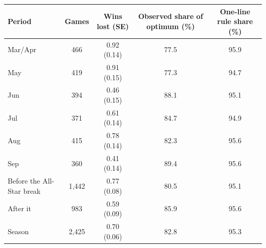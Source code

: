 \begin{tabular}{lcccc}
\toprule
Period & Games & Wins lost (SE) & Observed share of optimum (\%) & One-line rule share (\%) \\
\midrule
Mar/Apr & 466 & 0.92 (0.14) & 77.5 & 95.9 \\
May & 419 & 0.91 (0.15) & 77.3 & 94.7 \\
Jun & 394 & 0.46 (0.15) & 88.1 & 95.1 \\
Jul & 371 & 0.61 (0.14) & 84.7 & 94.9 \\
Aug & 415 & 0.78 (0.14) & 82.3 & 95.6 \\
Sep & 360 & 0.41 (0.14) & 89.4 & 95.6 \\
Before the All-Star break & 1{,}442 & 0.77 (0.08) & 80.5 & 95.1 \\
After it & 983 & 0.59 (0.09) & 85.9 & 95.6 \\
Season & 2{,}425 & 0.70 (0.06) & 82.8 & 95.3 \\
\bottomrule
\end{tabular}
